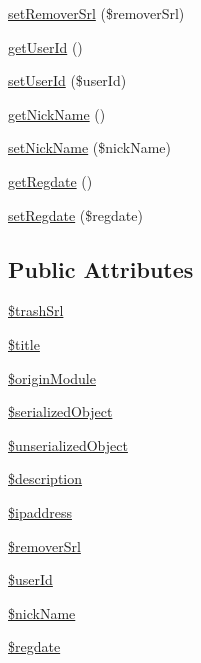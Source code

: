 \begin{DoxyCompactItemize}
\item 
\hyperlink{classTrashVO_a3bd22cfa2e432561f1fc50dfcdeb4983}{set\-Remover\-Srl} (\$remover\-Srl)
\item 
\hyperlink{classTrashVO_a2e999529c316982b83362d5e3af98675}{get\-User\-Id} ()
\item 
\hyperlink{classTrashVO_a170dc90ea1fec615ccc7aef649f89390}{set\-User\-Id} (\$user\-Id)
\item 
\hyperlink{classTrashVO_aba10424cba71a92cca060b6683f4f3af}{get\-Nick\-Name} ()
\item 
\hyperlink{classTrashVO_a27720ec735924373fea7f6aeea738892}{set\-Nick\-Name} (\$nick\-Name)
\item 
\hyperlink{classTrashVO_ac7de0db59f33f9c3db7410cc54432c5b}{get\-Regdate} ()
\item 
\hyperlink{classTrashVO_ac23c4bcbc9167b243f7f292190e35cb8}{set\-Regdate} (\$regdate)
\end{DoxyCompactItemize}
\subsection*{Public Attributes}
\begin{DoxyCompactItemize}
\item 
\hyperlink{classTrashVO_a8aeea2d547b7a335d987bcf4369a969c}{\$trash\-Srl}
\item 
\hyperlink{classTrashVO_ac6f85be76ea94f3fde44e0527bdcadc1}{\$title}
\item 
\hyperlink{classTrashVO_ad977787e04708af64f4c9d4891d3f682}{\$origin\-Module}
\item 
\hyperlink{classTrashVO_ac3834ed43d01357398d5a0d7f5a9c698}{\$serialized\-Object}
\item 
\hyperlink{classTrashVO_a43048c60bc9505999742be271b5d9385}{\$unserialized\-Object}
\item 
\hyperlink{classTrashVO_abf2e10398265d4954a9e23f06b29a190}{\$description}
\item 
\hyperlink{classTrashVO_add9ea842dcdbcd81a3fef932cd622e18}{\$ipaddress}
\item 
\hyperlink{classTrashVO_aa51410763a3b44a76853d8a347793903}{\$remover\-Srl}
\item 
\hyperlink{classTrashVO_a346f371317bde03b5a209e00cb33a603}{\$user\-Id}
\item 
\hyperlink{classTrashVO_a8084a8637a7a98cc7f1182bd7b86e5de}{\$nick\-Name}
\item 
\hyperlink{classTrashVO_a54388f0f415f3e5c302eec871e790434}{\$regdate}
\end{DoxyCompactItemize}


